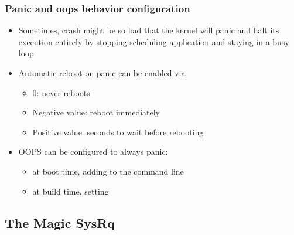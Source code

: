 \begin{frame}
  \frametitle{Panic and oops behavior configuration}
  \begin{itemize}
    \item Sometimes, crash might be so bad that the kernel will panic and halt
          its execution entirely by stopping scheduling application and staying
          in a busy loop.
    \item Automatic reboot on panic can be enabled via
    \begin{itemize}
      \item 0: never reboots
      \item Negative value: reboot immediately
      \item Positive value: seconds to wait before rebooting
    \end{itemize}
    \item OOPS can be configured to always panic:
    \begin{itemize}
      \item at boot time, adding  to the command line
      \item at build time, setting 
    \end{itemize}
  \end{itemize}
\end{frame}

\subsection{The Magic SysRq}

